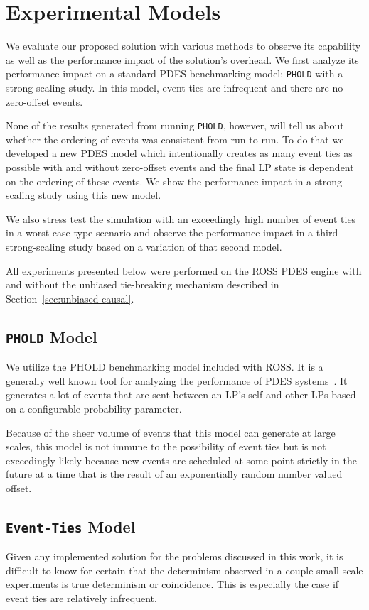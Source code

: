 \documentclass[nonacm,sigconf]{acmart}
\begin{document}
\section{Experimental Models}
We evaluate our proposed solution with various methods to observe its capability as well as the performance impact of the solution's overhead. We first analyze its performance impact on a standard PDES benchmarking model: \texttt{PHOLD} with a strong-scaling study. In this model, event ties are infrequent and there are no zero-offset events.

None of the results generated from running \texttt{PHOLD}, however, will tell us about whether the ordering of events was consistent from run to run. To do that we developed a new PDES model which intentionally creates as many event ties as possible with and without zero-offset events and the final LP state is dependent on the ordering of these events. We show the performance impact in a strong scaling study using this new model.

We also stress test the simulation with an exceedingly high number of event ties in a worst-case type scenario and observe the performance impact in a third strong-scaling study based on a variation of that second model.

All experiments presented below were performed on the ROSS PDES engine with and without the unbiased tie-breaking mechanism described in Section~\ref{sec:unbiased-causal}.


\subsection{\texttt{PHOLD} Model}
We utilize the PHOLD benchmarking model included with ROSS. It is a generally well known tool for analyzing the performance of PDES systems~\cite{fujimoto1990,barnes2013}. It generates a lot of events that are sent between an LP's self and other LPs based on a configurable probability parameter.

Because of the sheer volume of events that this model can generate at large scales, this model is not immune to the possibility of event ties but is not exceedingly likely because new events are scheduled at some point strictly in the future at a time that is the result of an exponentially random number valued offset.


\subsection{\texttt{Event-Ties} Model}\label{sec:eties}
Given any implemented solution for the problems discussed in this work, it is difficult to know for certain that the determinism observed in a couple small scale experiments is true determinism or coincidence. This is especially the case if event ties are relatively infrequent.
\end{document}
